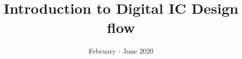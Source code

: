 \documentclass[]{slides}
\title{Introduction to Digital IC Design flow}
\date{February - June 2020}
\begin{document}
\begin{frame} \titlepage \end{frame}



\end{document}
